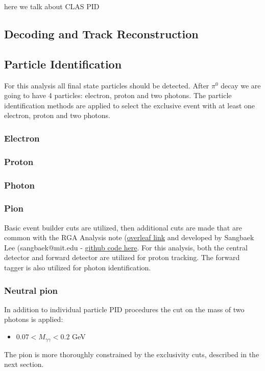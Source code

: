 here we talk about CLAS PID
\subsection{Decoding and Track Reconstruction}\label{sec:decrec}

\subsection{Particle Identification}


For this analysis all final state particles should be detected.
After $\pi^0$ decay we are going to have 4 particles: electron, proton and two photons.
The particle identification methods are applied to select the exclusive event with at least one electron, proton and two photons. 


    \subsubsection{Electron}
    \subsubsection{Proton}
    \subsubsection{Photon}
    \subsubsection{Pion}
    
    Basic event builder cuts are utilized, then additional cuts are made that are common with the RGA Analysis note (\href{https://www.overleaf.com/project/5ea737720942930001ff5e9c}{overleaf link} and developed by Sangbaek Lee (sangbaek@mit.edu - \href{https://github.com/Sangbaek/analysis_code/tree/analysis/pid}{github code here}. For this analysis, both the central detector and forward detector are utilized for proton tracking. The forward tagger is also utilized for photon identification. 
    


\subsubsection{Neutral pion}
    In addition to individual particle PID procedures the cut on the mass of two photons is applied:
    \begin{itemize}
    	\item $0.07<M_{\gamma\gamma}<0.2$ GeV
    \end{itemize}
    The pion is more thoroughly constrained by the exclusivity cuts, described in the next section.
    

